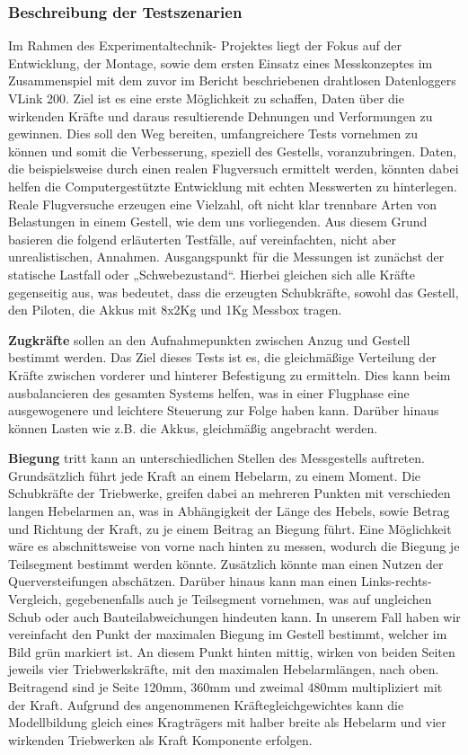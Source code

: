 \subsubsection{Beschreibung der Testszenarien}
Im Rahmen des Experimentaltechnik- Projektes liegt der Fokus auf der Entwicklung, der Montage, sowie dem ersten Einsatz eines Messkonzeptes im Zusammenspiel mit dem zuvor im Bericht beschriebenen drahtlosen Datenloggers VLink 200.
Ziel ist es eine erste Möglichkeit zu schaffen, Daten über die wirkenden Kräfte und daraus resultierende Dehnungen und Verformungen zu gewinnen.
Dies soll den Weg bereiten, umfangreichere Tests vornehmen zu können und somit die Verbesserung, speziell des Gestells, voranzubringen.
Daten, die beispielsweise durch einen realen Flugversuch ermittelt werden, könnten dabei helfen die Computergestützte Entwicklung mit echten Messwerten zu hinterlegen.
Reale Flugversuche erzeugen eine Vielzahl, oft nicht klar trennbare Arten von Belastungen in einem Gestell, wie dem uns vorliegenden.
Aus diesem Grund basieren die folgend erläuterten Testfälle, auf vereinfachten, nicht aber unrealistischen, Annahmen. 
Ausgangspunkt für die Messungen ist zunächst der statische Lastfall oder „Schwebezustand“.
Hierbei gleichen sich alle Kräfte gegenseitig aus, was bedeutet, dass die erzeugten Schubkräfte, sowohl das Gestell, den Piloten, die Akkus mit 8x2Kg und 1Kg Messbox tragen. 

\textbf{Zugkräfte} sollen an den Aufnahmepunkten zwischen Anzug und Gestell bestimmt werden.
Das Ziel dieses Tests ist es, die gleichmäßige Verteilung der Kräfte zwischen vorderer und hinterer Befestigung zu ermitteln.
Dies kann beim ausbalancieren des gesamten Systems helfen, was in einer Flugphase eine ausgewogenere und leichtere Steuerung zur Folge haben kann.
Darüber hinaus können Lasten wie z.B. die Akkus, gleichmäßig angebracht werden. 

\textbf{Biegung} tritt kann an unterschiedlichen Stellen des Messgestells auftreten. Grundsätzlich führt jede Kraft an einem Hebelarm, zu einem Moment.
Die Schubkräfte der Triebwerke, greifen dabei an mehreren Punkten mit verschieden langen Hebelarmen an, was in Abhängigkeit der Länge des Hebels,
sowie Betrag und Richtung der Kraft, zu je einem Beitrag an Biegung führt. Eine Möglichkeit wäre es abschnittsweise von vorne nach hinten zu messen,
wodurch die Biegung je Teilsegment bestimmt werden könnte. Zusätzlich könnte man einen Nutzen der Querversteifungen abschätzen. Darüber hinaus kann man einen Links-rechts-Vergleich, gegebenenfalls auch je Teilsegment vornehmen, was auf ungleichen Schub oder auch Bauteilabweichungen hindeuten kann. In unserem Fall haben wir vereinfacht den Punkt der maximalen Biegung im Gestell bestimmt, welcher im Bild grün markiert ist. An diesem Punkt hinten mittig, wirken von beiden Seiten jeweils vier Triebwerkskräfte, mit den maximalen Hebelarmlängen, nach oben. Beitragend sind je Seite 120mm, 360mm und zweimal 480mm multipliziert mit der Kraft. Aufgrund des angenommenen Kräftegleichgewichtes kann die Modellbildung gleich eines Kragträgers mit halber breite als Hebelarm und vier wirkenden Triebwerken als Kraft Komponente erfolgen. 

